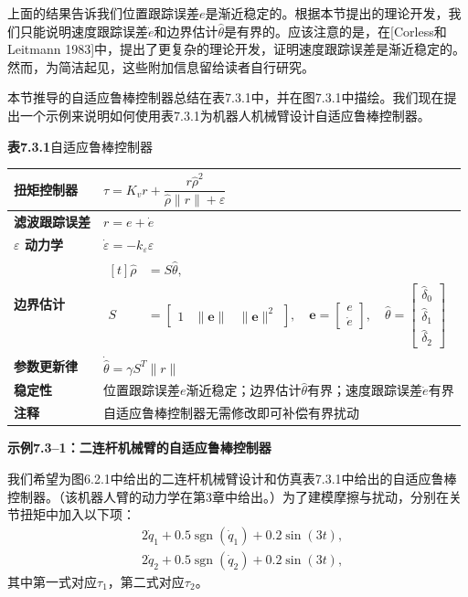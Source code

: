 \documentclass[UTF8]{ctexart}
\begin{document}
上面的结果告诉我们位置跟踪误差$e$是渐近稳定的。根据本节提出的理论开发，我们只能说明速度跟踪误差$\dot{e}$和边界估计$\hat{\theta}$是有界的。应该注意的是，在[Corless和Leitmann 1983]中，提出了更复杂的理论开发，证明速度跟踪误差是渐近稳定的。然而，为简洁起见，这些附加信息留给读者自行研究。

本节推导的自适应鲁棒控制器总结在表7.3.1中，并在图7.3.1中描绘。我们现在提出一个示例来说明如何使用表7.3.1为机器人机械臂设计自适应鲁棒控制器。

\textbf{表7.3.1}\quad 自适应鲁棒控制器

\begin{center}
\begin{tabular}{|l|l|}
\hline
\textbf{扭矩控制器} & $\tau = K_v r + \dfrac{r\hat{\rho}^2}{\hat{\rho}\|r\| + \varepsilon}$ \\
\hline
\textbf{滤波跟踪误差} & $r = e + \dot{e}$ \\
\hline
\textbf{$\varepsilon$ 动力学} & $\dot{\varepsilon} = -k_\varepsilon\varepsilon$ \\
\hline
\textbf{边界估计} & $\begin{aligned}[t]
\hat{\rho} &= S\hat{\theta},\\
S &= \begin{bmatrix} 1 & \|\mathbf{e}\| & \|\mathbf{e}\|^2 \end{bmatrix},\quad
\mathbf{e} = \begin{bmatrix} e \\ \dot{e} \end{bmatrix},\quad
\hat{\theta} = \begin{bmatrix} \hat{\delta}_0 \\ \hat{\delta}_1 \\ \hat{\delta}_2 \end{bmatrix}
\end{aligned}$ \\
\hline
\textbf{参数更新律} & $\dot{\hat{\theta}} = \gamma S^T\|r\|$ \\
\hline
\textbf{稳定性} & 位置跟踪误差$e$渐近稳定；边界估计$\hat{\theta}$有界；速度跟踪误差$\dot{e}$有界 \\
\hline
\textbf{注释} & 自适应鲁棒控制器无需修改即可补偿有界扰动 \\
\hline
\end{tabular}
\end{center}

\textbf{示例7.3--1：二连杆机械臂的自适应鲁棒控制器}

我们希望为图6.2.1中给出的二连杆机械臂设计和仿真表7.3.1中给出的自适应鲁棒控制器。（该机器人臂的动力学在第3章中给出。）为了建模摩擦与扰动，分别在关节扭矩中加入以下项：
\begin{equation}
\begin{aligned}
&2\dot{q}_1 + 0.5\operatorname{sgn}(\dot{q}_1) + 0.2\sin(3t),\\
&2\dot{q}_2 + 0.5\operatorname{sgn}(\dot{q}_2) + 0.2\sin(3t),
\end{aligned}
\end{equation}
其中第一式对应$\tau_1$，第二式对应$\tau_2$。
\end{document}
